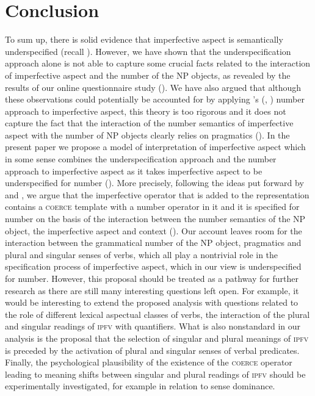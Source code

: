 \documentclass[output=paper]{langscibook}
\begin{document}
\section{Conclusion}\label{jan-bla:fansb:kb:sec6}

To sum up, there is solid evidence that imperfective aspect is semantically underspecified (recall ). However, we have shown that the underspecification approach alone is not able to capture some crucial facts related to the interaction of imperfective aspect and the number of the NP objects, as revealed by the results of our online questionnaire study (). We have also argued that although these observations could potentially be accounted for by applying \citeauthor{Ferreira2004}'s (\citeyear{Ferreira2004}, \citeyear{Ferreira2005}) number approach to imperfective aspect, this theory is too rigorous and it does not capture the fact that the interaction of the number semantics of imperfective aspect with the number of NP objects clearly relies on pragmatics (). In the present paper we propose a model of interpretation of imperfective aspect which in some sense combines the underspecification approach and the number approach to imperfective aspect as it takes imperfective aspect to be underspecified for number (). More precisely, following the ideas put forward by \citet{Dolling2003b,Dolling2003a,Dolling2014} and \citet{Egg2005}, we argue that the imperfective operator that is added to the representation contains a \textsc{coerce} template with a number operator in it and it is specified for number on the basis of the interaction between the number semantics of the NP object, the imperfective aspect and context (). Our account leaves room for the interaction between the grammatical number of the NP object, pragmatics and plural and singular senses of verbs, which all play a nontrivial role in the specification process of imperfective aspect, which in our view is underspecified for number. However, this proposal should be treated as a pathway for further research as there are still many interesting questions left open. For example, it would be interesting to extend the proposed analysis with questions related to the role of different lexical aspectual classes of verbs, the interaction of the plural and singular readings of \textsc{ipfv} with quantifiers. What is also nonstandard in our analysis is the proposal that the selection of singular and plural meanings of \textsc{ipfv} is preceded by the activation of plural and singular senses of verbal predicates. Finally, the psychological plausibility of the existence of the \textsc{coerce} operator leading to meaning shifts between singular and plural readings of \textsc{ipfv} should be experimentally investigated, for example in relation to sense dominance. 
\end{document}
